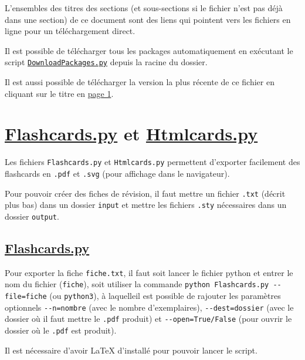 \documentclass[a4paper,12pt]{article}
\let\oldsection\section
\newcommand{\ssection}[2][]{\clearpage\oldsection[#1]{#2}}
\newcounter{pagenb}
\begin{document}
\vspace{0.5cm}

L'ensembles des titres des sections (et sous-sections si le fichier n'est pas déjà dans une section) de ce document sont des liens qui pointent vers les fichiers en ligne pour un téléchargement direct.

Il est possible de télécharger tous les packages automatiquement en exécutant le script \href{https://raw.githubusercontent.com/rfoxinter/revisions/refs/heads/main/output/DownloadPackages.py}{\texttt{DownloadPackages.py}} depuis la racine du dossier.

Il est aussi possible de télécharger la version la plus récente de ce fichier en cliquant sur le titre en \hyperlink{section*.1}{page 1}.
\setcounter{pagenb}{\thepage}
\newpage
{}
\tableofcontents
\null\newpage
{}
\setcounter{page}{\thepagenb}
\ssection[Flashcards.py et Htmlcards.py]{\href{https://raw.githubusercontent.com/rfoxinter/revisions/refs/heads/main/output/Flashcards.py}{\color{black}Flashcards.py} et \href{https://raw.githubusercontent.com/rfoxinter/revisions/refs/heads/main/output/Htmlcards.py}{\color{black}Htmlcards.py}}
Les fichiers \texttt{Flashcards.py} et \texttt{Htmlcards.py} permettent d'exporter facilement des flashcards en \texttt{.pdf} et \texttt{.svg} (pour affichage dans le navigateur).

Pour pouvoir créer des fiches de révision, il faut mettre un fichier \texttt{.txt} (décrit plus bas) dans un dossier \texttt{input} et mettre les fichiers \texttt{.sty} nécessaires dans un dossier \texttt{output}.
\subsection[Flashcards.py]{\href{https://raw.githubusercontent.com/rfoxinter/revisions/refs/heads/main/output/Flashcards.py}{\color{black}Flashcards.py}}
Pour exporter la fiche \texttt{fiche.txt}, il faut soit lancer le fichier python et entrer le nom du fichier (\texttt{fiche}), soit utiliser la commande \texttt{python Flashcards.py -{}-file=fiche} (ou \texttt{python3}), à laquelleil est possible de rajouter les paramètres optionnels \texttt{-{}-n=nombre} (avec le nombre d'exemplaires), \texttt{-{}-dest=dossier} (avec le dossier où il faut mettre le \texttt{.pdf} produit) et \texttt{-{}-open=True/False} (pour ouvrir le dossier où le \texttt{.pdf} est produit).

Il est nécessaire d'avoir \LaTeX{} d'installé pour pouvoir lancer le script.
\end{document}
